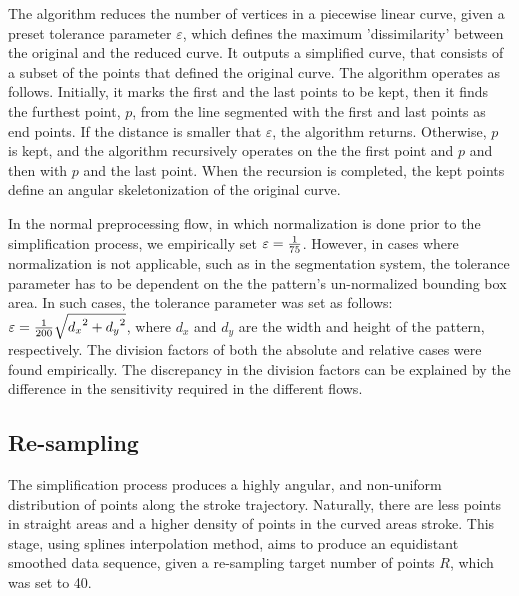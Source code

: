 \iftoggle{edit-mode}{\hspace{0pt}\marginpar{The Douglas-Peucker algorithm}}{}
The algorithm reduces the number of vertices in a piecewise linear curve, given a preset tolerance parameter $\varepsilon$, which defines the maximum 'dissimilarity' between the original and the reduced curve.
It outputs a simplified curve, that consists of a subset of the points that defined the original curve.
The algorithm operates as follows. 
Initially, it marks the first and the last points to be kept, then it finds the furthest point, $p$, from the line segmented with the first and last points as end points.
If the distance is smaller that $\varepsilon$, the algorithm returns. 
Otherwise, $p$ is kept, and the algorithm recursively operates on the the first point and $p$ and then with $p$ and the last point.
When the recursion is completed, the kept points define an angular skeletonization of the original curve.

\iftoggle{edit-mode}{\hspace{0pt}\marginpar{Different tolerance parameters}}{}
In the normal preprocessing flow, in which normalization is done prior to the simplification process, we empirically set $\varepsilon  = {1 \over 75}$.
However, in cases where normalization is not applicable, such as in the segmentation system, the tolerance parameter has to be dependent on the the pattern's un-normalized bounding box area. 
In such cases, the tolerance parameter was set as follows: $\varepsilon  = {1 \over {200}}\sqrt {{d_x}^2 + {d_y}^2}$, where $d_x$ and $d_y$ are the width and height of the pattern, respectively. 
The division factors of both the absolute and relative cases were found empirically. 
The discrepancy in the division factors can be explained by the difference in the sensitivity required in the different flows. 

\subsection{Re-sampling}
\iftoggle{edit-mode}{\hspace{0pt}\marginpar{Goal}}{}
The simplification process produces a highly angular, and non-uniform distribution of points along the stroke trajectory.
Naturally, there are less points in straight areas and a higher density of points in the curved areas stroke. 
This stage, using splines interpolation method, aims to produce an equidistant smoothed data sequence, given a re-sampling target number of points $R$, which was set to 40. 

